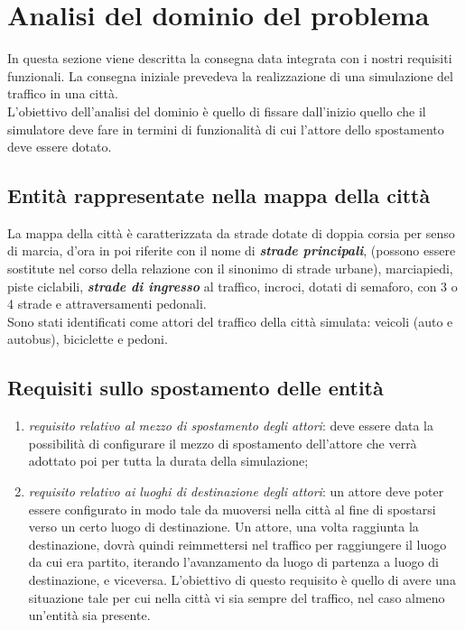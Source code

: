 \section{Analisi del dominio del problema}
In questa sezione viene descritta la consegna data integrata con i nostri
requisiti funzionali. La consegna iniziale prevedeva la realizzazione di una
simulazione del traffico in una città. \\
L'obiettivo dell'analisi del dominio è quello di fissare dall'inizio quello che
il simulatore deve fare in termini di funzionalità di cui l'attore dello
spostamento deve essere dotato.

\subsection{Entità rappresentate nella mappa della città}
\label{firstmappa}
La mappa della città è caratterizzata da strade dotate di doppia corsia per
senso di marcia, d'ora in poi riferite con il nome di \textit{\textbf{strade
principali}}, (possono essere sostitute nel corso della relazione con il sinonimo di strade urbane),
marciapiedi, piste ciclabili, \textit{\textbf{strade di ingresso}} al traffico,
incroci, dotati di semaforo, con 3 o 4 strade e attraversamenti pedonali.\\
Sono stati identificati come attori del traffico della città simulata: veicoli
(auto e autobus), biciclette e pedoni.

\subsection{Requisiti sullo spostamento delle entità}
\begin{enumerate}
\item {\textit{requisito relativo al mezzo di spostamento degli attori}}: deve
essere data la possibilità di configurare il mezzo di spostamento dell'attore
che verrà adottato poi per tutta la durata della simulazione;
\item {\textit{requisito relativo ai luoghi di destinazione degli attori}}: un
attore deve poter essere configurato in modo tale da muoversi nella città al
fine di spostarsi verso un certo luogo di destinazione.
Un attore, una volta raggiunta la destinazione, dovrà quindi reimmettersi nel
traffico per raggiungere il luogo da cui era partito, iterando 
l'avanzamento da luogo di partenza a luogo di destinazione, e viceversa.
L'obiettivo di questo requisito è quello di avere una situazione tale per cui
nella città vi sia sempre del traffico, nel caso almeno un'entità sia presente.
\end{enumerate}


